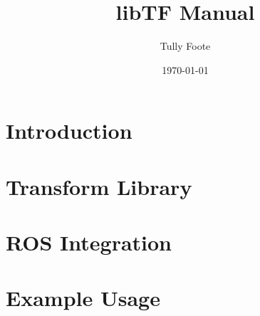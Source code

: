 \documentclass[12pt]{article}
\begin{document}
\title{libTF Manual}
\author{Tully Foote} 
\date{\today}
\maketitle

\tableofcontents
\pagebreak

\section{Introduction}

\section{Transform Library}

\section{ROS Integration}

\section{Example Usage}
\end{document}
